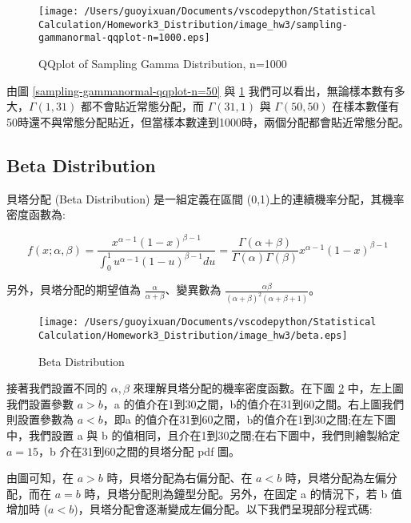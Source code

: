 \begin{figure}[H]
    \centering
        \texttt{[image: /Users/guoyixuan/Documents/vscodepython/Statistical Calculation/Homework3\_Distribution/image\_hw3/sampling-gammanormal-qqplot-n=1000.eps]}
    \caption{QQplot of Sampling Gamma Distribution, n=1000}
    \label{sampling-gammanormal-qqplot-n=1000}
\end{figure}

\newpage

由圖 \ref{sampling-gammanormal-qqplot-n=50} 與 \ref{sampling-gammanormal-qqplot-n=1000} 我們可以看出，無論樣本數有多大，$\Gamma(1,31)$ 都不會貼近常態分配，而 $\Gamma(31,1)$ 與 $\Gamma(50,50)$ 在樣本數僅有50時還不與常態分配貼近，但當樣本數達到1000時，兩個分配都會貼近常態分配。

\subsection{Beta Distribution}

貝塔分配 (Beta Distribution) 是一組定義在區間 (0,1)上的連續機率分配，其機率密度函數為:

\begin{equation}
f(x;\alpha,\beta)=\frac{x^{\alpha-1}(1-x)^{\beta-1}}{\int_{0}^{1}u^{\alpha-1}(1-u)^{\beta-1}du}=\frac{\Gamma(\alpha+\beta)}{\Gamma(\alpha)\Gamma(\beta)}x^{\alpha-1}(1-x)^{\beta-1}
\end{equation}

另外，貝塔分配的期望值為 $\frac{\alpha}{\alpha+\beta}$、變異數為 $\frac{\alpha \beta}{(\alpha+\beta)^2 (\alpha+\beta+1)}$。

\begin{figure}[H]
    \centering
        \texttt{[image: /Users/guoyixuan/Documents/vscodepython/Statistical Calculation/Homework3\_Distribution/image\_hw3/beta.eps]}
    \caption{Beta Distribution}
    \label{Beta Distribution}
\end{figure}

接著我們設置不同的 $\alpha,\beta$ 來理解貝塔分配的機率密度函數。在下圖 \ref{Beta Distribution} 中，左上圖我們設置參數 $a > b$，a 的值介在1到30之間，b的值介在31到60之間。右上圖我們則設置參數為 $a < b$，即a 的值介在31到60之間，b的值介在1到30之間;在左下圖中，我們設置 a 與 b 的值相同，且介在1到30之間;在右下圖中，我們則繪製給定 $a=15$，b 介在31到60之間的貝塔分配 pdf 圖。

由圖可知，在 $a>b$ 時，貝塔分配為右偏分配、在 $a<b$ 時，貝塔分配為左偏分配，而在 $a=b$ 時，貝塔分配則為鐘型分配。另外，在固定 a 的情況下，若 b 值增加時 ($a<b$)，貝塔分配會逐漸變成左偏分配。以下我們呈現部分程式碼:

